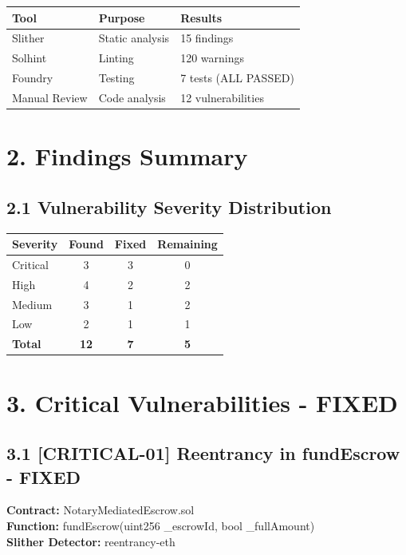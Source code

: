 \documentclass[12pt,a4paper]{article}
\begin{document}
\begin{table}[h]
\centering
\begin{tabular}{llp{5cm}}
\toprule
\textbf{Tool} & \textbf{Purpose} & \textbf{Results} \\
\midrule
Slither & Static analysis & 15 findings \\
Solhint & Linting & 120 warnings \\
Foundry & Testing & 7 tests (ALL PASSED) \\
Manual Review & Code analysis & 12 vulnerabilities \\
\bottomrule
\end{tabular}
\end{table}

\bigskip
\section*{2. Findings Summary}

\subsection*{2.1 Vulnerability Severity Distribution}

\begin{table}[h]
\centering
\begin{tabular}{lccc}
\toprule
\textbf{Severity} & \textbf{Found} & \textbf{Fixed} & \textbf{Remaining} \\
\midrule
Critical & 3 & 3 & 0 \\
High & 4 & 2 & 2 \\
Medium & 3 & 1 & 2 \\
Low & 2 & 1 & 1 \\
\midrule
\textbf{Total} & \textbf{12} & \textbf{7} & \textbf{5} \\
\bottomrule
\end{tabular}
\end{table}

\bigskip
\section*{3. Critical Vulnerabilities - FIXED}

\subsection*{3.1 [CRITICAL-01] Reentrancy in fundEscrow - FIXED}

\textbf{Contract:} NotaryMediatedEscrow.sol \\
\textbf{Function:} fundEscrow(uint256 \_escrowId, bool \_fullAmount) \\
\textbf{Slither Detector:} reentrancy-eth
\end{document}
